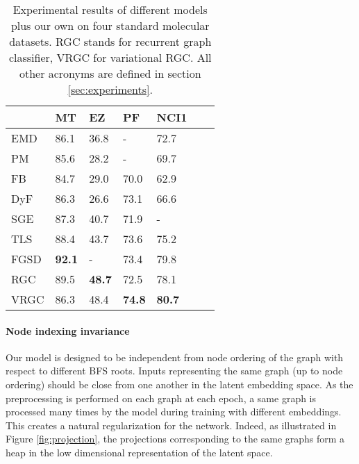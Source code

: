 \documentclass{article} \usepackage{iclr2019_conference}
\begin{document}
\begin{table}
    \centering
    \renewcommand{\arraystretch}{1.2}
    \begin{tabular}{l|M{1.5cm} M{1.5cm} M{1.5cm} M{1.5cm} M{1.5cm} M{1.5cm}}
           & MT            &      EZ       & PF            & NCI1 \\
      \hline
      EMD  & 86.1          &     36.8      & -             & 72.7 \\
      PM   & 85.6          &     28.2      & -             & 69.7 \\
      FB   & 84.7          &     29.0      & 70.0          & 62.9 \\
      DyF  & 86.3          &     26.6      & 73.1          & 66.6 \\
      SGE  & 87.3          &     40.7      & 71.9          & - \\
      TLS  & 88.4          &     43.7      & 73.6          & 75.2 \\
      FGSD & \textbf{92.1} &     -         & 73.4          & 79.8 \\
      \hline
      RGC  & 89.5          & \textbf{48.7} & 72.5          & 78.1 \\
      VRGC & 86.3          & 48.4          & \textbf{74.8} & \textbf{80.7} \\
      \end{tabular}
  \caption{Experimental results of different models plus our own on four standard molecular datasets. RGC stands for recurrent graph classifier, VRGC for variational RGC. All other acronyms are defined in section \ref{sec:experiments}.}
  \label{tab:results}
\end{table}



\paragraph{Node indexing invariance}
Our model is designed to be independent from node ordering of the graph with respect to different BFS roots. Inputs representing the same graph (up to node ordering) should be close from one another in the latent embedding space. As the preprocessing is performed on each graph at each epoch, a same graph is processed many times by the model during training with different embeddings. This creates a natural regularization for the network. Indeed, as illustrated in Figure \ref{fig:projection}, the projections corresponding to the same graphs form a heap in the low dimensional representation of the latent space.
\end{document}
